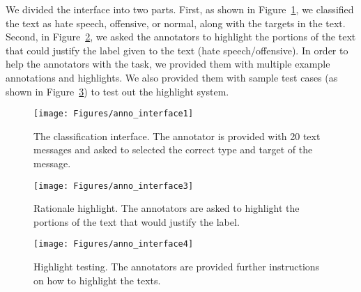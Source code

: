 \documentclass[letterpaper]{article} \usepackage{aaai21}  \usepackage{times}  \usepackage{helvet} \usepackage{courier}  \usepackage[hyphens]{url}  \usepackage{graphicx} \urlstyle{rm} \def\UrlFont{\rm}  \usepackage{natbib}  \usepackage{caption}
\begin{document}
We divided the interface into two parts. First, as shown in Figure~\ref{fig:anno1}, we classified the text as hate speech, offensive, or normal, along with the targets in the text. Second, in Figure~\ref{fig:anno3}, we asked the annotators to highlight the portions of the text that could justify the label given to the text (hate speech/offensive). In order to help the annotators with the task, we provided them with multiple example annotations and highlights. We also provided them with sample test cases (as shown in Figure~\ref{fig:anno4}) to test out the highlight system.



\begin{figure}[!tbh]
 \texttt{[image: Figures/anno\_interface1]}
 \caption{The classification interface. The annotator is provided with 20 text messages and asked to selected the correct type and target of the message.} 
 \label{fig:anno1}
\end{figure}

\begin{figure}[!tbh]
 \texttt{[image: Figures/anno\_interface3]}
 \caption{Rationale highlight. The annotators are asked to highlight the portions of the text that would justify the label.} 
 \label{fig:anno3}
\end{figure}


\begin{figure}[!tbh]
 \texttt{[image: Figures/anno\_interface4]}
 \caption{Highlight testing. The annotators are provided further instructions on how to highlight the texts.} 
 \label{fig:anno4}
\end{figure}
\end{document}
